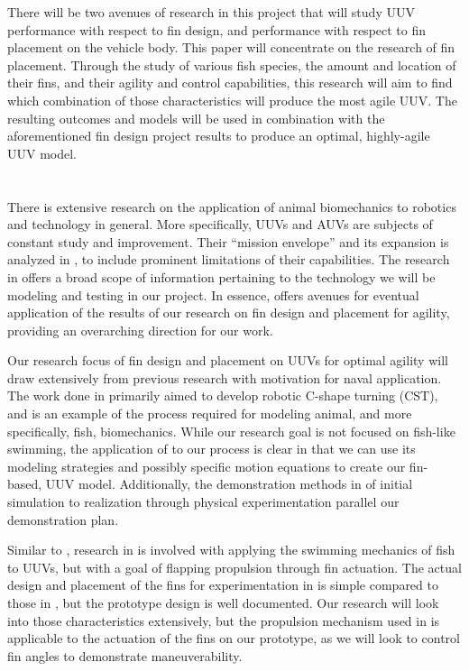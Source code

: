 \documentclass{IEEEtran}
\begin{document}
There will be two avenues of research in this project that will study UUV performance with respect to fin design, and performance with respect to fin placement on the vehicle body. This paper will concentrate on the research of fin placement. Through the study of various fish species, the amount and location of their fins, and their agility and control capabilities, this research will aim to find which combination of those characteristics will produce the most agile UUV. The resulting outcomes and models will be used in combination with the aforementioned fin design project results to produce an optimal, highly-agile UUV model.





\section{}
There is extensive research on the application of animal biomechanics to robotics and technology in general. More specifically, UUVs and AUVs are subjects of constant study and improvement. Their ``mission envelope'' and its expansion is analyzed in \cite{nrc2005autonomous}, to include prominent limitations of their capabilities. The research in \cite{nrc2005autonomous} offers a broad scope of information pertaining to the technology we will be modeling and testing in our project. In essence, \cite{nrc2005autonomous} offers avenues for eventual application of the results of our research on fin design and placement for agility, providing an overarching direction for our work.

Our research focus of fin design and placement on UUVs for optimal agility will draw extensively from previous research with motivation for naval application. The work done in \cite{noaa2009how} primarily aimed to develop robotic C-shape turning (CST), and is an example of the process required for modeling animal, and more specifically, fish, biomechanics. While our research goal is not focused on fish-like swimming, the application of \cite{noaa2009how} to our process is clear in that we can use its modeling strategies and possibly specific motion equations to create our fin-based, UUV model. Additionally, the demonstration methods in \cite{noaa2009how} of initial simulation to realization through physical experimentation parallel our demonstration plan.

Similar to \cite{noaa2009how}, research in \cite{maslin2020raising} is involved with applying the swimming mechanics of fish to UUVs, but with a goal of flapping propulsion through fin actuation. The actual design and placement of the fins for experimentation in \cite{maslin2020raising} is simple compared to those in \cite{noaa2009how}, but the prototype design is well documented. Our research will look into those characteristics extensively, but the propulsion mechanism used in \cite{maslin2020raising} is applicable to the actuation of the fins on our prototype, as we will look to control fin angles to demonstrate maneuverability.
\end{document}
